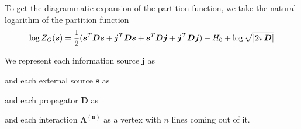 \documentclass[letterpaper,12pt]{article}
\newcommand{\crossvertex}[1]{
    \draw[ultra thick] (#1) ++(-0.1,-0.1) -- ++(0.2,0.2);
    \draw[ultra thick] (#1) ++(-0.1,0.1) -- ++(0.2,-0.2);
}
\begin{document}
To get the diagrammatic expansion of the partition function, we take the natural logarithm of the partition function 
\begin{equation}
    \log Z_{G}(\bm{s}) = \frac{1}{2}(\bm{s}^{T}\bm{D}\bm{s} + \bm{j}^{T}\bm{D}\bm{s} + \bm{s}^{T}\bm{D}\bm{j} + \bm{j}^{T}\bm{D}\bm{j}) - H_{0} + \log \sqrt{\abs{2\pi \bm{D}}}
\end{equation}

\vspace*{0.5cm}
We represent each information source $\bm{j}$ as 
and each external source $\bm{s}$ as
and each propagator $\bm{D}$ as
and each interaction $\bm{\Lambda^{(n)}}$ as a vertex with $n$ lines coming out of it.
\end{document}
